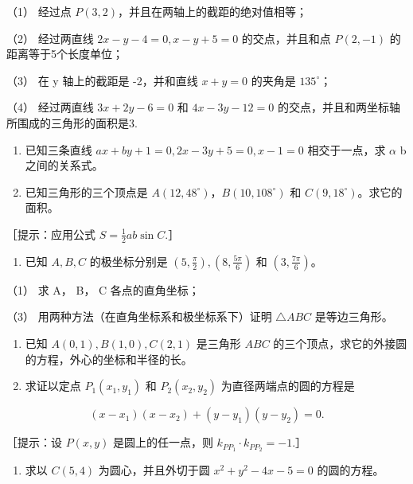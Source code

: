 （1） 经过点 \(P(3, 2)\)，并且在两轴上的截距的绝对值相等；

（2） 经过两直线 \(2x - y - 4 = 0, x - y + 5 = 0\) 的交点，并且和点
\(P(2, -1)\) 的距离等于5个长度单位；

（3） 在 y 轴上的截距是 -2，并和直线 \(x + y = 0\) 的夹角是
\(135^{\circ}\)；

（4） 经过两直线 \(3x + 2y - 6 = 0\) 和 \(4x - 3y - 12 = 0\)
的交点，并且和两坐标轴所围成的三角形的面积是3.

\begin{enumerate}
\def\labelenumi{\arabic{enumi}.}
\setcounter{enumi}{7}
\item
  已知三条直线 \(ax + by + 1 = 0, 2x - 3y + 5 = 0, x - 1 = 0\)
  相交于一点，求 \(\alpha\) b 之间的关系式。
\item
  已知三角形的三个顶点是 \(A(12, 48^{\circ})\)，\(B(10, 108^{\circ})\)
  和 \(C(9, 18^{\circ})\)。求它的面积。
\end{enumerate}

［提示：应用公式 \(S = \frac{1}{2} ab\sin C.\)］

\begin{enumerate}
\def\labelenumi{\arabic{enumi}.}
\setcounter{enumi}{9}
\tightlist
\item
  已知 \(A, B, C\) 的极坐标分别是
  \(\left(5, \frac{\pi}{2}\right), \left(8, \frac{5\pi}{6}\right)\) 和
  \(\left(3, \frac{7\pi}{6}\right)\)。
\end{enumerate}

（1） 求 A， B， C 各点的直角坐标；

（3） 用两种方法（在直角坐标系和极坐标系下）证明 \(\triangle ABC\)
是等边三角形。

\begin{enumerate}
\def\labelenumi{\arabic{enumi}.}
\setcounter{enumi}{10}
\item
  已知 \(A(0,1), B(1,0), C(2,1)\) 是三角形 \(ABC\)
  的三个顶点，求它的外接圆的方程，外心的坐标和半径的长。
\item
  求证以定点 \(P_{1}(x_{1}, y_{1})\) 和 \(P_{2}(x_{2}, y_{2})\)
  为直径两端点的圆的方程是
\end{enumerate}

\[
(x - x_{1}) (x - x_{2}) + (y - y_{1}) (y - y_{2}) = 0.
\]

［提示：设 \(P(x, y)\) 是圆上的任一点，则
\(k_{PP_1} \cdot k_{PP_2} = -1\).］

\begin{enumerate}
\def\labelenumi{\arabic{enumi}.}
\setcounter{enumi}{12}
\tightlist
\item
  求以 \(C(5,4)\) 为圆心，并且外切于圆 \(x^{2} + y^{2} - 4x - 5 = 0\)
  的圆的方程。
\end{enumerate}

